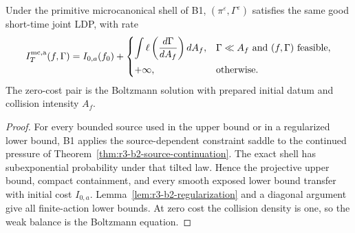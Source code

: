 \begin{theorem}
\label{thm:r3-b2-mc-ldp}
Under the primitive microcanonical shell of B1,
\((\pi^\varepsilon,\Gamma^\varepsilon)\) satisfies the same good short-time
joint LDP, with rate
\[
 I_T^{\rm mc,a}(f,\Gamma)
 =I_{0,a}(f_0)
 +\begin{cases}
 \displaystyle\int
 \ell\left(\frac{d\Gamma}{dA_f}\right)dA_f,
 &\Gamma\ll A_f\text{ and }(f,\Gamma)\text{ feasible},\\[2ex]
 +\infty,&\text{otherwise}.
 \end{cases}
\]
The zero-cost pair is the Boltzmann solution with prepared initial datum and
collision intensity \(A_f\).
\end{theorem}

\begin{proof}
For every bounded source used in the upper bound or in a regularized lower
bound, B1 applies the source-dependent constraint saddle to the continued
pressure of Theorem~\ref{thm:r3-b2-source-continuation}.  The exact shell has
subexponential probability under that tilted law.  Hence the projective upper
bound, compact containment, and every smooth exposed lower bound transfer with
initial cost \(I_{0,a}\).  Lemma~\ref{lem:r3-b2-regularization} and a diagonal
argument give all finite-action lower bounds.  At zero cost the collision
density is one, so the weak balance is the Boltzmann equation.
\end{proof}
